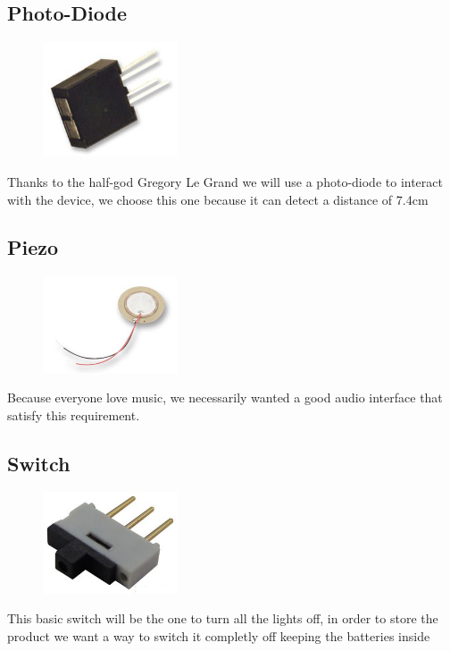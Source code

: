 \documentclass[12pt,a4paper,landscape]{article}
\begin{document}
\begin{multicols}{2}
			\vspace{4cm}

	\subsection*{Photo-Diode}
			\begin{figure}[H]
			\centering
			\includegraphics[width=4cm]{images/photo-diode.png}
			\end{figure}
			Thanks to the half-god Gregory Le Grand we will use a photo-diode to interact with the device, we choose this one because it can detect a distance of 7.4cm

	\subsection*{Piezo}
			\begin{figure}[H]
			\centering
			\includegraphics[width=4cm]{images/piezo.png}
			\end{figure}
			Because everyone love music, we necessarily wanted a good audio interface that satisfy this requirement.

	\subsection*{Switch}
			\begin{figure}[H]
			\centering
			\includegraphics[width=4cm]{images/switch.png}
			\end{figure}
			This basic switch will be the one to turn all the lights off, in order to store the product we want a way to switch it completly off keeping the batteries inside


\end{multicols}
\end{document}
